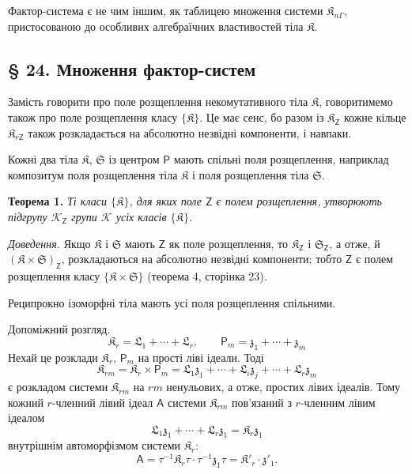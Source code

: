\documentclass[11pt]{article}
\begin{document}
Фактор-система є не чим іншим, як таблицею множення системи \(\mathfrak K_{n\Gamma}\), пристосованою до особливих алгебраїчних властивостей тіла \(\mathfrak K\).

\subsection*{§ 24. Множення фактор-систем}\label{multiplikation-von-faktorensystemen}

Замість говорити про поле розщеплення некомутативного тіла \(\mathfrak K\), говоритимемо також про поле розщеплення класу \(\{\mathfrak K\}\). Це має сенс, бо разом із \(\mathfrak K_{\mathsf{Z}}\) кожне кільце \(\mathfrak K_{r\mathsf{Z}}\) також розкладається на абсолютно незвідні компоненти, і навпаки.

Кожні два тіла \(\mathfrak K\), \(\mathfrak S\) із центром \(\mathsf P\) мають спільні поля розщеплення, наприклад композитум поля розщеплення тіла \(\mathfrak K\) і поля розщеплення тіла \(\mathfrak S\).

\textbf{Теорема 1.} \emph{Ті класи \(\{\mathfrak K\}\), для яких поле \(\mathsf{Z}\) є полем розщеплення, утворюють підгрупу \(\mathscr K_{\mathsf{Z}}\) групи \(\mathscr K\) усіх класів \(\{\mathfrak K\}\).}

\emph{Доведення.} Якщо \(\mathfrak K\) і \(\mathfrak S\) мають \(\mathsf{Z}\) як поле розщеплення, то \(\mathfrak K_{\mathsf{Z}}\) і \(\mathfrak S_{\mathsf{Z}}\), а отже, й \((\mathfrak K\times\mathfrak S)_{\mathsf{Z}}\), розкладаються на абсолютно незвідні компоненти; тобто \(\mathsf{Z}\) є полем розщеплення класу \(\{\mathfrak K\times\mathfrak S\}\) (теорема 4, сторінка 23).

Реципрокно ізоморфні тіла мають усі поля розщеплення спільними.

Допоміжний розгляд.
\[
\mathfrak K_r=\mathfrak L_1+\cdots+\mathfrak L_r,\qquad
\mathsf P_m=\mathfrak z_1+\cdots+\mathfrak z_m
\]
Нехай це розклади \(\mathfrak K_r\), \(\mathsf P_m\) на прості ліві ідеали. Тоді
\[
\mathfrak K_{rm}=\mathfrak K_r\times\mathsf P_m
=\mathfrak L_1\mathfrak z_1+\cdots+\mathfrak L_i\mathfrak z_j+\cdots+\mathfrak L_r\mathfrak z_m
\]
є розкладом системи \(\mathfrak K_{rm}\) на \(rm\) ненульових, а отже, простих лівих ідеалів. Тому кожний \(r\)-членний лівий ідеал \(\mathsf{A}\) системи \(\mathfrak K_{rm}\) пов'язаний з \(r\)-членним лівим ідеалом
\[
\mathfrak L_1\mathfrak z_1+\cdots+\mathfrak L_r\mathfrak z_1=\mathfrak K_r\mathfrak z_1
\]
внутрішнім автоморфізмом системи \(\mathfrak K_r\):
\[
\mathsf{A}=\tau^{-1}\mathfrak K_r\tau\cdot\tau^{-1}\mathfrak z_1\tau
=\mathfrak K'_r\cdot\mathfrak z'_1.
\]
\end{document}
